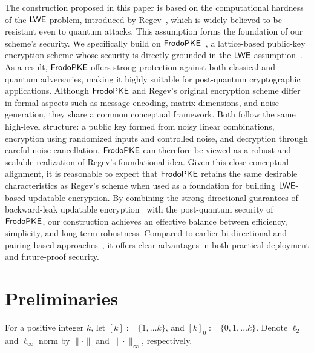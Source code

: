 \documentclass{fundam}
\begin{document}
The construction proposed in this paper is based on the computational hardness of the $\mathsf{LWE}$ problem, introduced by Regev~\cite{regev2009lattices}, which is widely believed to be resistant even to quantum attacks. This assumption forms the foundation of our scheme’s security. We specifically build on $\mathsf{FrodoPKE}$~\cite{Frodo,Frodo2}, a lattice-based public-key encryption scheme whose security is directly grounded in the $\mathsf{LWE}$ assumption~\cite{regev2009lattices}. As a result, $\mathsf{FrodoPKE}$ offers strong protection against both classical and quantum adversaries, making it highly suitable for post-quantum cryptographic applications. Although $\mathsf{FrodoPKE}$ and Regev’s original encryption scheme differ in formal aspects such as message encoding, matrix dimensions, and noise generation, they share a common conceptual framework. Both follow the same high-level structure: a public key formed from noisy linear combinations, encryption using randomized inputs and controlled noise, and decryption through careful noise cancellation. $\mathsf{FrodoPKE}$ can therefore be viewed as a robust and scalable realization of Regev’s foundational idea. Given this close conceptual alignment, it is reasonable to expect that $\mathsf{FrodoPKE}$ retains the same desirable characteristics as Regev’s scheme when used as a foundation for building $\mathsf{LWE}$-based updatable encryption. By combining the strong directional guarantees of backward-leak updatable encryption~\cite{nishimaki2022direction} with the post-quantum security of $\mathsf{FrodoPKE}$, our construction achieves an effective balance between efficiency, simplicity, and long-term robustness. Compared to earlier bi-directional and pairing-based approaches~\cite{LT18, BDGJ20}, it offers clear advantages in both practical deployment and future-proof security.

\section{Preliminaries}
For a positive integer $k$, let $[k]:=\{1,\ldots k\}$, and $[k]_{0}:=\{0,1,\ldots k\}$. Denote $\ell_{2}$ and $\ell_{\infty}$ norm by $\|\cdot\|$ and $\|\cdot\|_{\infty}$, respectively. 
\end{document}
